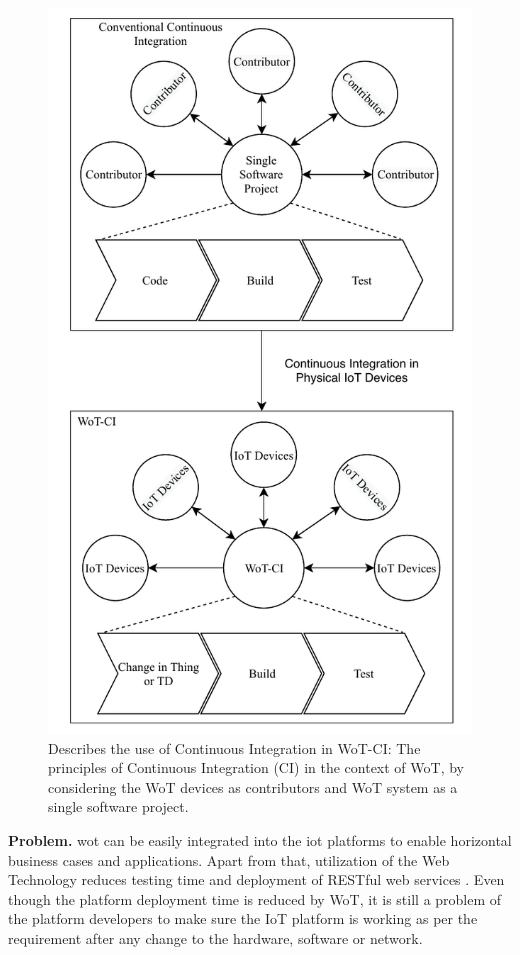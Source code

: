 \documentclass[conference]{IEEEtran}
\theoremstyle{definition}
\begin{document}
\begin{figure}[t]
  \centerline{\includegraphics[scale=0.6]{iotSystem} }
  
  \caption{Describes the use of Continuous Integration in WoT-CI: The principles of Continuous Integration (CI) in the context of WoT, by considering the WoT devices as contributors and WoT system as a single software project.}
  \label{fig:WoT-CI}
\end{figure}

\textbf{Problem. }\ac{wot} can be easily integrated into the \ac{iot} platforms to enable horizontal business cases and applications. 
Apart from that, utilization of the Web Technology reduces testing time and deployment of RESTful web services \cite{datta2018advances}.
Even though the platform deployment time is reduced by WoT, it is still a problem of the platform developers to make sure the IoT platform is working as per the requirement after any change to the hardware, software or network.
\end{document}
